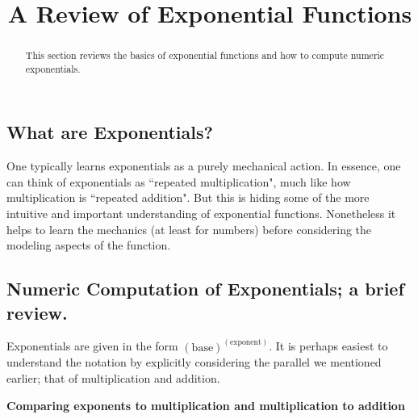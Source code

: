 \documentclass{ximera}
\title{A Review of Exponential Functions}
\begin{document}
\begin{abstract}
    This section reviews the basics of exponential functions and how to compute numeric exponentials.
\end{abstract}
\maketitle


\subsection*{What are Exponentials?}

    One typically learns exponentials as a purely mechanical action. In essence, one can think of exponentials as ``repeated multiplication", much like how multiplication is ``repeated addition". But this is hiding some of the more intuitive and important understanding of exponential functions. Nonetheless it helps to learn the mechanics (at least for numbers) before considering the modeling aspects of the function.

\subsection*{Numeric Computation of Exponentials; a brief review.}

    Exponentials are given in the form $(\text{base})^{(\text{exponent})}$. It is perhaps easiest to understand the notation by explicitly considering the parallel we mentioned earlier; that of multiplication and addition.
    
        {\bfseries Comparing exponents to multiplication and multiplication to addition}\\%
        
\end{document}
